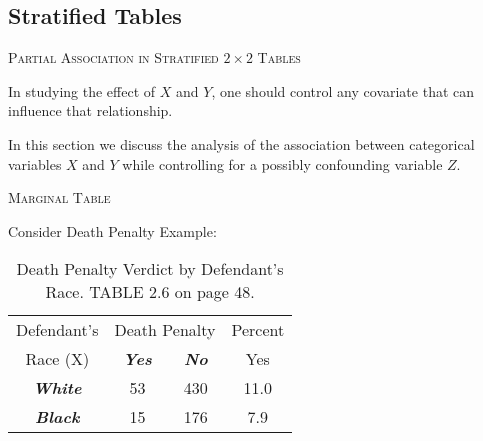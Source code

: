 \documentclass[dvipdfmx, serif,handout]{beamer}
\begin{document}
\subsection{Stratified Tables}
\begin{frame}{\textsc{Partial Association in Stratified $2\times 2$ Tables}}

\bi
\item In studying the effect of $X$ and $Y$, one should control any covariate that can influence that relationship.
\item In this section we discuss the analysis of the association between categorical variables $X$ and $Y$ while controlling for a possibly confounding variable $Z$.
\ei

\end{frame}
\begin{frame}{\textsc{Marginal Table}}

\bi
\item Consider Death Penalty Example:
\vspace{.5cm}
{\scriptsize
\begin{table} %
\begin{tabular}{cccc} \hline
Defendant's & \multicolumn{2}{c}{Death Penalty} (Y)& Percent \\ \cline{2-3}
{Race} (X)& {\bf{\em Yes}} & {\bf{\em No}} & Yes \\ \hline
{\bf{\em White}} & 53 & 430 & 11.0 \\
{\bf{\em Black}} & 15 & 176 & 7.9 \\ \hline
\end{tabular}
\caption{\scriptsize Death Penalty Verdict by Defendant's Race. TABLE 2.6 on page 48.}
\end{table}
}
\ei

\end{frame}
\end{document}
